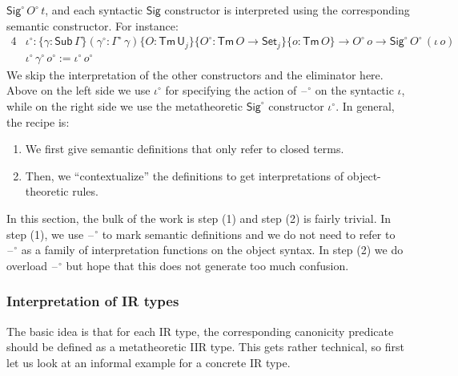 \documentclass[acmsmall,screen,review]{acmart}
\newcommand{\msf}[1]{{\mathsf{#1}}}
\newcommand{\U}{\msf{U}}
\newcommand{\Set}{\msf{Set}}
\newcommand{\Sig}{\msf{Sig}}
\newcommand{\blank}{{\mathord{\hspace{1pt}\text{--}\hspace{1pt}}}}
\newcommand{\Sub}{\msf{Sub}}
\newcommand{\Tm}{\msf{Tm}}
\newcommand{\w}{\circ}
\begin{document}
$\Sig^\w\,O^\w\,t$, and each syntactic $\Sig$ constructor is interpreted using the corresponding
semantic constructor. For instance:
\begin{alignat*}{4}
  &\iota^\w : \{\gamma : \Sub\,\Gamma\}(\gamma^\w : \Gamma^\w\,\gamma)\{O : \Tm\,\U_j\}\{O^\w : \Tm\,O \to \Set_j\}\{o : \Tm\,O\} \to O^\w\,o \to \Sig^\w\,O^\w\,(\iota\,o)\\
  &\iota^\w\,\gamma^\w\,o^\w := \iota^\w\,o^\w
\end{alignat*}
We skip the interpretation of the other constructors and the eliminator here. Above on the left side
we use $\iota^\w$ for specifying the action of $\blank^\w$ on the syntactic $\iota$, while on the
right side we use the metatheoretic $\Sig^\w$ constructor $\iota^\w$. In general, the recipe is:
\begin{enumerate}
\item We first give semantic definitions that only refer to closed terms.
\item Then, we ``contextualize'' the definitions to get interpretations of object-theoretic rules.
\end{enumerate}
In this section, the bulk of the work is step (1) and step (2) is fairly trivial. In step (1), we
use $\blank^\w$ to mark semantic definitions and we do not need to refer to $\blank^\w$ as a family
of interpretation functions on the object syntax. In step (2) we do overload $\blank^\w$ but hope
that this does not generate too much confusion.

\subsubsection{Interpretation of IR types}\label{sec:ir-canonicity}

The basic idea is that for each IR type, the corresponding canonicity predicate should be defined as
a metatheoretic IIR type. This gets rather technical, so first let us look at an informal example
for a concrete IR type.
\end{document}
